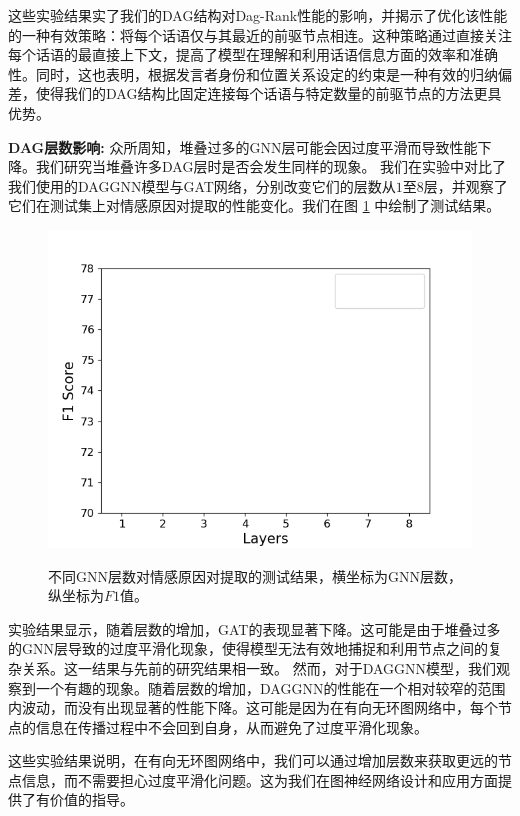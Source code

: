 这些实验结果实了我们的DAG结构对Dag-Rank性能的影响，并揭示了优化该性能的一种有效策略：将每个话语仅与其最近的前驱节点相连。这种策略通过直接关注每个话语的最直接上下文，提高了模型在理解和利用话语信息方面的效率和准确性。同时，这也表明，根据发言者身份和位置关系设定的约束是一种有效的归纳偏差，使得我们的DAG结构比固定连接每个话语与特定数量的前驱节点的方法更具优势。

\textbf{DAG层数影响: }
\label{sec:layers}
众所周知，堆叠过多的GNN层可能会因过度平滑而导致性能下降。我们研究当堆叠许多DAG层时是否会发生同样的现象。
我们在实验中对比了我们使用的DAGGNN模型与GAT网络\cite{velivckovic2017graph}，分别改变它们的层数从$1$至$8$层，并观察了它们在测试集上对情感原因对提取的性能变化。我们在图 \ref{fig:layernum1} 中绘制了测试结果。



\begin{figure}[ht] \label{decom}
    \centering
 \hspace{-0.2cm}
    \centering  %
    \includegraphics[width=0.6\linewidth]{figures/score.png}
    \label{fig:layernum1}
     \vspace{8pt}
    \caption{不同GNN层数对情感原因对提取的测试结果，横坐标为GNN层数，纵坐标为$F1$值。}
\end{figure}


    
实验结果显示，随着层数的增加，GAT的表现显著下降。这可能是由于堆叠过多的GNN层导致的过度平滑化现象，使得模型无法有效地捕捉和利用节点之间的复杂关系。这一结果与先前的研究结果相一致。
然而，对于DAGGNN模型，我们观察到一个有趣的现象。随着层数的增加，DAGGNN的性能在一个相对较窄的范围内波动，而没有出现显著的性能下降。这可能是因为在有向无环图网络中，每个节点的信息在传播过程中不会回到自身，从而避免了过度平滑化现象。

这些实验结果说明，在有向无环图网络中，我们可以通过增加层数来获取更远的节点信息，而不需要担心过度平滑化问题。这为我们在图神经网络设计和应用方面提供了有价值的指导。

